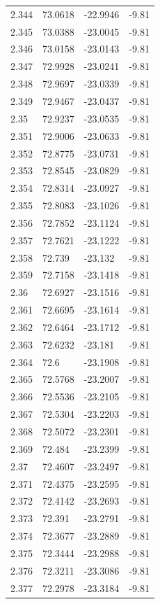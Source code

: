 \begin{tabular}{llll}
2.344 & 73.0618 & -22.9946 & -9.81 \\
2.345 & 73.0388 & -23.0045 & -9.81 \\
2.346 & 73.0158 & -23.0143 & -9.81 \\
2.347 & 72.9928 & -23.0241 & -9.81 \\
2.348 & 72.9697 & -23.0339 & -9.81 \\
2.349 & 72.9467 & -23.0437 & -9.81 \\
2.35 & 72.9237 & -23.0535 & -9.81 \\
2.351 & 72.9006 & -23.0633 & -9.81 \\
2.352 & 72.8775 & -23.0731 & -9.81 \\
2.353 & 72.8545 & -23.0829 & -9.81 \\
2.354 & 72.8314 & -23.0927 & -9.81 \\
2.355 & 72.8083 & -23.1026 & -9.81 \\
2.356 & 72.7852 & -23.1124 & -9.81 \\
2.357 & 72.7621 & -23.1222 & -9.81 \\
2.358 & 72.739 & -23.132 & -9.81 \\
2.359 & 72.7158 & -23.1418 & -9.81 \\
2.36 & 72.6927 & -23.1516 & -9.81 \\
2.361 & 72.6695 & -23.1614 & -9.81 \\
2.362 & 72.6464 & -23.1712 & -9.81 \\
2.363 & 72.6232 & -23.181 & -9.81 \\
2.364 & 72.6 & -23.1908 & -9.81 \\
2.365 & 72.5768 & -23.2007 & -9.81 \\
2.366 & 72.5536 & -23.2105 & -9.81 \\
2.367 & 72.5304 & -23.2203 & -9.81 \\
2.368 & 72.5072 & -23.2301 & -9.81 \\
2.369 & 72.484 & -23.2399 & -9.81 \\
2.37 & 72.4607 & -23.2497 & -9.81 \\
2.371 & 72.4375 & -23.2595 & -9.81 \\
2.372 & 72.4142 & -23.2693 & -9.81 \\
2.373 & 72.391 & -23.2791 & -9.81 \\
2.374 & 72.3677 & -23.2889 & -9.81 \\
2.375 & 72.3444 & -23.2988 & -9.81 \\
2.376 & 72.3211 & -23.3086 & -9.81 \\
2.377 & 72.2978 & -23.3184 & -9.81 \\

\end{tabular}
